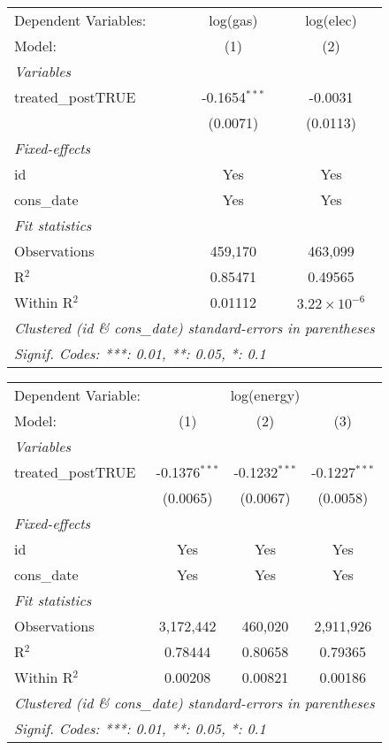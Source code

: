 
\begin{tabular}{lcc}
   \tabularnewline\midrule\midrule
   Dependent Variables: & log(gas)        & log(elec)\\
   Model:               & (1)             & (2)\\
   \midrule \emph{Variables} &   &  \\
   treated\_postTRUE   & -0.1654$^{***}$ & -0.0031\\
                        & (0.0071)        & (0.0113)\\
   \midrule \emph{Fixed-effects} &   &  \\
   id                   & Yes             & Yes\\
   cons\_date          & Yes             & Yes\\
   \midrule \emph{Fit statistics} &   &  \\
   Observations         & 459,170         & 463,099\\
   R$^2$                & 0.85471         & 0.49565\\
   Within R$^2$         & 0.01112         & $3.22\times 10^{-6}$\\
   \midrule\midrule\multicolumn{3}{l}{\emph{Clustered (id \& cons\_date) standard-errors in parentheses}}\\
   \multicolumn{3}{l}{\emph{Signif. Codes: ***: 0.01, **: 0.05, *: 0.1}}\\
\end{tabular}



\begin{tabular}{lccc}
   \tabularnewline\midrule\midrule
   Dependent Variable: & \multicolumn{3}{c}{log(energy)}\\
   Model:             & (1)             & (2)             & (3)\\
   \midrule \emph{Variables} &   &   &  \\
   treated\_postTRUE & -0.1376$^{***}$ & -0.1232$^{***}$ & -0.1227$^{***}$\\
                      & (0.0065)        & (0.0067)        & (0.0058)\\
   \midrule \emph{Fixed-effects} &   &   &  \\
   id                 & Yes             & Yes             & Yes\\
   cons\_date        & Yes             & Yes             & Yes\\
   \midrule \emph{Fit statistics} &   &   &  \\
   Observations       & 3,172,442       & 460,020         & 2,911,926\\
   R$^2$              & 0.78444         & 0.80658         & 0.79365\\
   Within R$^2$       & 0.00208         & 0.00821         & 0.00186\\
   \midrule\midrule\multicolumn{4}{l}{\emph{Clustered (id \& cons\_date) standard-errors in parentheses}}\\
   \multicolumn{4}{l}{\emph{Signif. Codes: ***: 0.01, **: 0.05, *: 0.1}}\\
\end{tabular}


